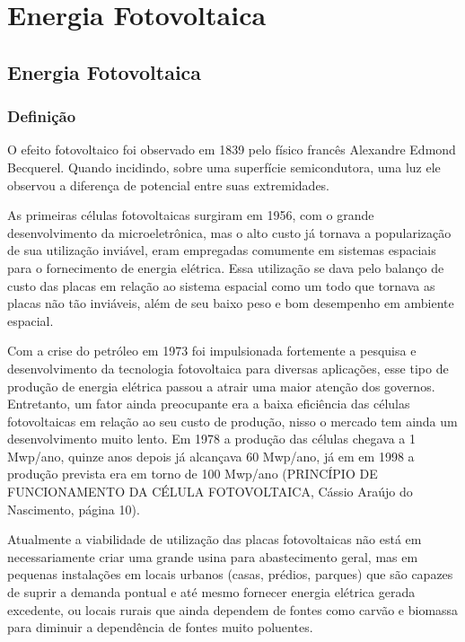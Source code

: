 \part{Energia Fotovoltaica}
\chapter[Energia Fotovoltaica]{Energia Fotovoltaica}
\section{Definição}
O efeito fotovoltaico foi observado em 1839 pelo físico francês Alexandre Edmond Becquerel. Quando incidindo, sobre uma superfície semicondutora, uma luz ele observou a diferença de potencial entre suas extremidades.

\par As primeiras células fotovoltaicas surgiram em 1956, com o grande desenvolvimento da microeletrônica, mas o alto custo já tornava a popularização de sua utilização inviável, eram empregadas comumente em sistemas espaciais para o fornecimento de energia elétrica. Essa utilização se dava pelo balanço de custo das placas em relação ao sistema espacial como um todo que tornava as placas não tão inviáveis, além de seu baixo peso e bom desempenho em ambiente espacial.

\par Com a crise do petróleo em 1973 foi impulsionada fortemente a pesquisa e desenvolvimento da tecnologia fotovoltaica para diversas aplicações, esse tipo de produção de energia elétrica passou a atrair uma maior atenção dos governos. Entretanto, um fator ainda preocupante era a baixa eficiência das células fotovoltaicas em relação ao seu custo de produção, nisso o mercado tem ainda um desenvolvimento muito lento. Em 1978 a produção das células chegava a 1 Mwp/ano, quinze anos depois já alcançava 60 Mwp/ano, já em em 1998 a produção prevista era em torno de 100 Mwp/ano (PRINCÍPIO DE FUNCIONAMENTO DA CÉLULA FOTOVOLTAICA, Cássio Araújo do Nascimento, página 10).

\par Atualmente a viabilidade de utilização das placas fotovoltaicas não está em necessariamente criar uma grande usina para abastecimento geral, mas em pequenas instalações em locais urbanos (casas, prédios, parques) que são capazes de suprir a demanda pontual e até mesmo fornecer energia elétrica gerada excedente, ou locais rurais que ainda dependem de fontes como carvão e biomassa para diminuir a dependência de fontes muito poluentes.

